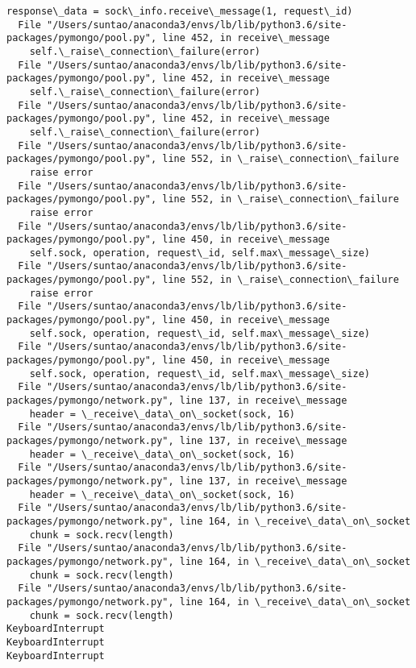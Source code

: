 \documentclass[11pt]{article}
\begin{document}
\begin{Verbatim}[commandchars=\\\{\}]
    response\_data = sock\_info.receive\_message(1, request\_id)
  File "/Users/suntao/anaconda3/envs/lb/lib/python3.6/site-packages/pymongo/pool.py", line 452, in receive\_message
    self.\_raise\_connection\_failure(error)
  File "/Users/suntao/anaconda3/envs/lb/lib/python3.6/site-packages/pymongo/pool.py", line 452, in receive\_message
    self.\_raise\_connection\_failure(error)
  File "/Users/suntao/anaconda3/envs/lb/lib/python3.6/site-packages/pymongo/pool.py", line 452, in receive\_message
    self.\_raise\_connection\_failure(error)
  File "/Users/suntao/anaconda3/envs/lb/lib/python3.6/site-packages/pymongo/pool.py", line 552, in \_raise\_connection\_failure
    raise error
  File "/Users/suntao/anaconda3/envs/lb/lib/python3.6/site-packages/pymongo/pool.py", line 552, in \_raise\_connection\_failure
    raise error
  File "/Users/suntao/anaconda3/envs/lb/lib/python3.6/site-packages/pymongo/pool.py", line 450, in receive\_message
    self.sock, operation, request\_id, self.max\_message\_size)
  File "/Users/suntao/anaconda3/envs/lb/lib/python3.6/site-packages/pymongo/pool.py", line 552, in \_raise\_connection\_failure
    raise error
  File "/Users/suntao/anaconda3/envs/lb/lib/python3.6/site-packages/pymongo/pool.py", line 450, in receive\_message
    self.sock, operation, request\_id, self.max\_message\_size)
  File "/Users/suntao/anaconda3/envs/lb/lib/python3.6/site-packages/pymongo/pool.py", line 450, in receive\_message
    self.sock, operation, request\_id, self.max\_message\_size)
  File "/Users/suntao/anaconda3/envs/lb/lib/python3.6/site-packages/pymongo/network.py", line 137, in receive\_message
    header = \_receive\_data\_on\_socket(sock, 16)
  File "/Users/suntao/anaconda3/envs/lb/lib/python3.6/site-packages/pymongo/network.py", line 137, in receive\_message
    header = \_receive\_data\_on\_socket(sock, 16)
  File "/Users/suntao/anaconda3/envs/lb/lib/python3.6/site-packages/pymongo/network.py", line 137, in receive\_message
    header = \_receive\_data\_on\_socket(sock, 16)
  File "/Users/suntao/anaconda3/envs/lb/lib/python3.6/site-packages/pymongo/network.py", line 164, in \_receive\_data\_on\_socket
    chunk = sock.recv(length)
  File "/Users/suntao/anaconda3/envs/lb/lib/python3.6/site-packages/pymongo/network.py", line 164, in \_receive\_data\_on\_socket
    chunk = sock.recv(length)
  File "/Users/suntao/anaconda3/envs/lb/lib/python3.6/site-packages/pymongo/network.py", line 164, in \_receive\_data\_on\_socket
    chunk = sock.recv(length)
KeyboardInterrupt
KeyboardInterrupt
KeyboardInterrupt

    \end{Verbatim}
\end{document}

